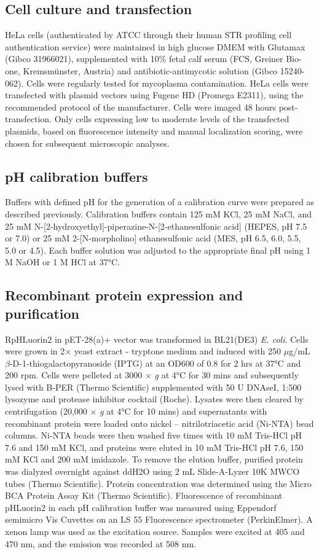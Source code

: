 \subsection{Cell culture and transfection}

HeLa cells (authenticated by ATCC through their human STR profiling cell authentication service) were maintained in high glucose DMEM with Glutamax (Gibco 31966021), supplemented with 10\% fetal calf serum (FCS, Greiner Bio-one, Kremsmünster, Austria) and antibiotic-antimycotic solution (Gibco 15240-062). Cells were regularly tested for mycoplasma contamination. HeLa cells were transfected with plasmid vectors using Fugene HD (Promega E2311), using the recommended protocol of the manufacturer. Cells were imaged 48 hours post-transfection. Only cells expressing low to moderate levels of the transfected plasmids, based on fluorescence intensity and manual localization scoring, were chosen for subsequent microscopic analyses.

\subsection{pH calibration buffers}
Buffers with defined pH for the generation of a calibration curve were prepared as described previously\cite{ma_live-cell_2017}. Calibration buffers contain 125 mM KCl, 25 mM NaCl, and 25 mM N-[2-hydroxyethyl]-piperazine-N-[2-ethanesulfonic acid] (HEPES, pH 7.5 or 7.0) or 25 mM 2-[N-morpholino] ethanesulfonic acid (MES, pH 6.5, 6.0, 5.5, 5.0 or 4.5). Each buffer solution was adjusted to the appropriate final pH using 1 M NaOH or 1 M HCl at 37°C.

\subsection{Recombinant protein expression and purification}
RpHLuorin2 in pET-28(a)+ vector was transformed in BL21(DE3) \emph{E. coli}. Cells were grown in 2$\times$ yeast extract - tryptone medium and induced with 250 $\mu$g/mL $\beta$-D-1-thiogalactopyranoside (IPTG) at an OD600 of 0.8 for 2 hrs at 37°C and 200 rpm. Cells were pelleted at 3000 $\times$ \emph{g} at 4°C for 30 mins and subsequently lysed with B-PER (Thermo Scientific) supplemented with 50 U DNAseI, 1:500 lysozyme and protease inhibitor cocktail (Roche). Lysates were then cleared by centrifugation (20,000 $\times$ \emph{g} at 4°C for 10 mins) and supernatants with recombinant protein were loaded onto nickel – nitrilotriacetic acid (Ni-NTA) bead columns. Ni-NTA beads were then washed five times with 10 mM Tris-HCl pH 7.6 and 150 mM KCl, and proteins were eluted in 10 mM Tris-HCl pH 7.6, 150 mM KCl and 200 mM imidazole. To remove the elution buffer, purified protein was dialyzed overnight against ddH2O using 2 mL Slide-A-Lyzer 10K MWCO tubes (Thermo Scientific). Protein concentration was determined using the Micro BCA Protein Assay Kit (Thermo Scientific). Fluorescence of recombinant pHLuorin2 in each pH calibration buffer was measured using Eppendorf semimicro Vis Cuvettes on an LS 55 Fluorescence spectrometer (PerkinElmer). A xenon lamp was used as the excitation source. Samples were excited at 405 and 470 nm, and the emission was recorded at 508 nm.

